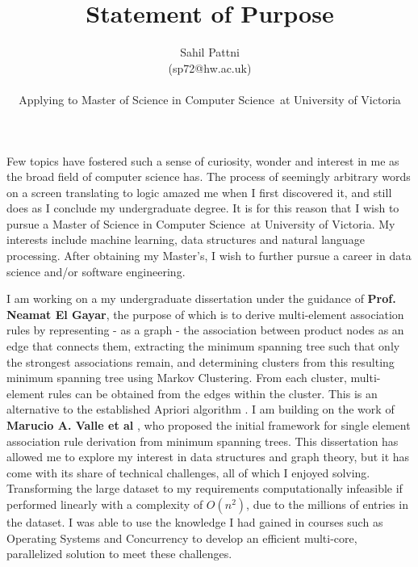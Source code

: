 \documentclass[a4paper,11pt]{article}
\newcommand{\uni}{University of Victoria}
\newcommand{\program}{Master of Science in Computer Science}
\newcommand{\supervisor}{\textbf{Prof. Neamat El Gayar}}
\begin{document}
\title{Statement of Purpose}

\author{Sahil Pattni\\(sp72@hw.ac.uk)\\\\Applying to \program\  at \uni}
\date{}
\maketitle

Few topics have fostered such a sense of curiosity, wonder and interest in me as the broad field of computer science has. The process of seemingly arbitrary words on a screen translating to logic amazed me when I first discovered it, and still does as I conclude my undergraduate degree. It is for this reason that I wish to pursue a \program\ at \uni. My interests include machine learning, data structures and natural language processing. After obtaining my Master's, I wish to further pursue a career in data science and/or software engineering.


I am working on a my undergraduate dissertation under the guidance of \supervisor, the purpose of which is to derive multi-element association rules by representing - as a graph - the association between product nodes as an edge that connects them, extracting the minimum spanning tree such that only the strongest associations remain, and determining clusters from this resulting minimum spanning tree using Markov Clustering. From each cluster, multi-element rules can be obtained from the edges within the cluster. This is an alternative to the established Apriori algorithm \cite{apriori}. I am building on the work of \textbf{Marucio A. Valle et al} \cite{mst_paper}, who proposed the initial framework for single element association rule derivation from minimum spanning trees. This dissertation has allowed me to explore my interest in data structures and graph theory, but it has come with its share of technical challenges, all of which I enjoyed solving. Transforming the large dataset to my requirements computationally infeasible if performed linearly with a complexity of $O(n^2)$, due to the millions of entries in the dataset. I was able to use the knowledge I had gained in courses such as Operating Systems and Concurrency to develop an efficient multi-core, parallelized solution to meet these challenges.
\end{document}
